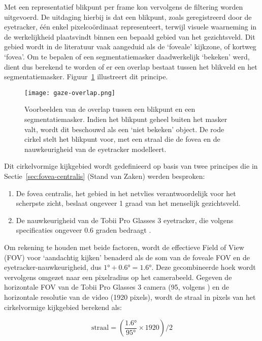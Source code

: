 Met een representatief blikpunt per frame kon vervolgens de filtering worden uitgevoerd. 
De uitdaging hierbij is dat een blikpunt, zoals geregistreerd door de eyetracker, één enkel pixelcoördinaat representeert, 
terwijl visuele waarneming in de werkelijkheid plaatsvindt binnen een bepaald gebied van het gezichtsveld. 
Dit gebied wordt in de literatuur vaak aangeduid als de `foveale' kijkzone, of kortweg `fovea'.
Om te bepalen of een segmentatiemasker daadwerkelijk `bekeken' werd, dient dus berekend te worden of er een 
overlap bestaat tussen het blikveld en het segmentatiemasker. Figuur~\ref{fig:gaze-overlap} illustreert dit principe.

\begin{figure}[H]
  \centering
  \texttt{[image: gaze-overlap.png]}
  \caption[
    Voorbeeld van overlapping van blikpunt en segmentatiemasker
  ]{\label{fig:gaze-overlap} 
    Voorbeelden van de overlap tussen een blikpunt en een segmentatiemasker.
    Indien het blikpunt geheel buiten het masker valt, wordt dit beschouwd als een `niet bekeken' object.
    De rode cirkel stelt het blikpunt voor, met een straal die de fovea en de nauwkeurigheid van de eyetracker modelleert.
  }
\end{figure}

Dit cirkelvormige kijkgebied wordt gedefinieerd op basis van twee principes die in 
Sectie~\ref{sec:fovea-centralis} (Stand van Zaken) werden besproken:
\begin{enumerate}
    \item De fovea centralis, het gebied in het netvlies verantwoordelijk voor het scherpste zicht, beslaat ongeveer 1 graad van het menselijk gezichtsveld.
    \item De nauwkeurigheid van de Tobii Pro Glasses 3 eyetracker, die volgens specificaties ongeveer 0.6 graden bedraagt \autocite{Tobii2025a}.
\end{enumerate}

Om rekening te houden met beide factoren, wordt de effectieve Field of View (FOV) voor 
`aandachtig kijken' benaderd als de som van de foveale FOV en de eyetracker-nauwkeurigheid, dus \(1° + 0.6° = 1.6° \).
Deze gecombineerde hoek wordt vervolgens omgezet naar een pixelradius op het camerabeeld. 
Gegeven de horizontale FOV van de Tobii Pro Glasses 3 camera (95\textdegree, volgens \textcite{Tobii2025a}) en de horizontale resolutie van de video (1920 pixels),
wordt de straal in pixels van het cirkelvormige kijkgebied berekend als:

\[
\text{straal} = \left( \frac{\text{1.6°}}{\text{95°}} \times \text{1920} \right) / 2
\]

